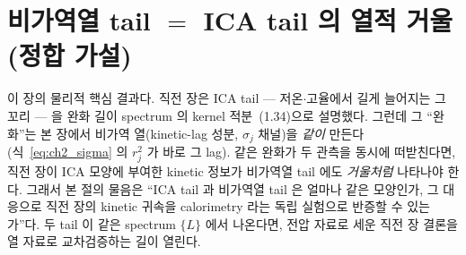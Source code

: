 \documentclass[11pt,a4paper]{article}
\begin{document}
\section{비가역열 tail $=$ ICA tail 의 열적 거울(정합 가설)}\label{sec:ch2_thermal_tail}
이 장의 물리적 핵심 결과다. 직전 장은 ICA tail — 저온$\cdot$고율에서 길게 늘어지는 그 꼬리 — 을 완화 길이 spectrum
의 kernel 적분~(1.34)으로 설명했다. 그런데 그 ``완화''는 본 장에서 비가역 열(kinetic-lag 성분, $\sigma_j$ 채널)을
\emph{같이} 만든다(식~\eqref{eq:ch2_sigma} 의 $r_j^2$ 가 바로 그 lag). 같은 완화가 두 관측을 동시에 떠받친다면,
직전 장이 ICA 모양에 부여한 kinetic 정보가 비가역열 tail 에도 \emph{거울처럼} 나타나야 한다. 그래서 본 절의 물음은
``ICA tail 과 비가역열 tail 은 얼마나 같은 모양인가, 그 대응으로 직전 장의 kinetic 귀속을 calorimetry 라는 독립
실험으로 반증할 수 있는가''다. 두 tail 이 같은 spectrum $\{L\}$ 에서 나온다면, 전압 자료로 세운 직전 장 결론을
열 자료로 교차검증하는 길이 열린다.
\end{document}

